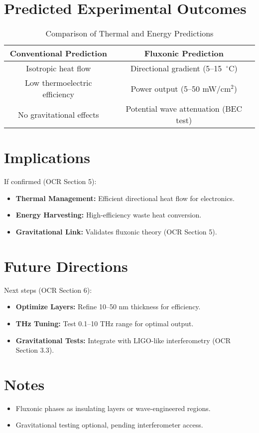 \documentclass[a4paper,12pt]{article}
\begin{document}
\section{Predicted Experimental Outcomes}
\begin{table}[h]
    \centering
    \begin{tabular}{|c|c|}
        \hline
        \textbf{Conventional Prediction} & \textbf{Fluxonic Prediction} \\
        \hline
        Isotropic heat flow & Directional gradient (5--15~$^\circ$C) \\
        Low thermoelectric efficiency & Power output (5--50 mW/cm$^2$) \\
        No gravitational effects & Potential wave attenuation (BEC test) \\
        \hline
    \end{tabular}
    \caption{Comparison of Thermal and Energy Predictions}
    \label{tab:predictions}
\end{table}

\section{Implications}
If confirmed (OCR Section 5):
\begin{itemize}
    \item \textbf{Thermal Management:} Efficient directional heat flow for electronics.
    \item \textbf{Energy Harvesting:} High-efficiency waste heat conversion.
    \item \textbf{Gravitational Link:} Validates fluxonic theory (OCR Section 5).
\end{itemize}

\section{Future Directions}
Next steps (OCR Section 6):
\begin{itemize}
    \item \textbf{Optimize Layers:} Refine 10--50 nm thickness for efficiency.
    \item \textbf{THz Tuning:} Test 0.1--10 THz range for optimal output.
    \item \textbf{Gravitational Tests:} Integrate with LIGO-like interferometry (OCR Section 3.3).
\end{itemize}

\section{Notes}
\begin{itemize}
    \item Fluxonic phases as insulating layers or wave-engineered regions.
    \item Gravitational testing optional, pending interferometer access.
\end{itemize}
\end{document}
